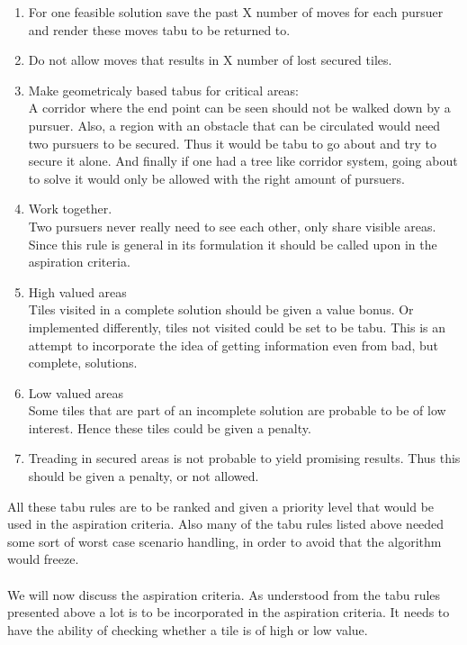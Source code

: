 \begin{enumerate}
\item{}For one feasible solution save the past X number of moves for each pursuer and render these moves tabu to be returned to.
\item{}Do not allow moves that results in X number of lost secured tiles.
\item{}Make geometricaly based tabus for critical areas:\vspace{0,1cm}\\
A corridor where the end point can be seen should not be walked down by a pursuer. Also, a region with an obstacle that can be circulated would need two pursuers to be secured. Thus it would be tabu to go about and try to secure it alone. And finally if one had a tree like corridor system, going about to solve it would only be allowed with the right amount of pursuers.
\item{} Work together. \vspace{0,1cm}\\
Two pursuers never really need to see each other, only share visible areas. Since this rule is general in its formulation it should be called upon in the aspiration criteria.
\item{} High valued areas \vspace{0,1cm}\\
Tiles visited in a complete solution should be given a value bonus. Or implemented differently, tiles not visited could be set to be tabu. This is an attempt to incorporate the idea of getting information even from bad, but complete, solutions.
\item{} Low valued areas \vspace{0,1cm}\\
Some tiles that are part of an incomplete solution are probable to be of low interest. Hence these tiles could be given a penalty.
\item{} Treading in secured areas is not probable to yield promising results. Thus this should be given a penalty, or not allowed.
\end{enumerate}

All these tabu rules are to be ranked and given a priority level that would be used in the aspiration criteria. Also many of the tabu rules listed above needed some sort of worst case scenario handling, in order to avoid that the algorithm would freeze.\\
\\We will now discuss the aspiration criteria. As understood from the tabu rules presented above a lot is to be incorporated in the aspiration criteria. It needs to have the ability of checking whether a tile is of high or low value.

